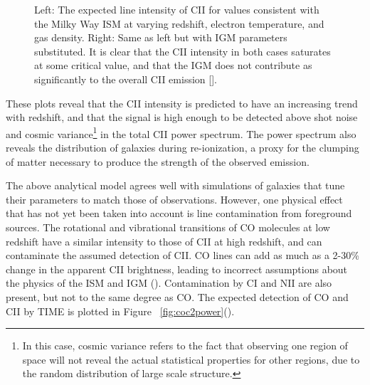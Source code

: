 \documentclass[manuscript]{aastex}
\begin{document}
\begin{figure}[H]%
    \centering
    \qquad
    \singlespace
    \caption[Calculated line intensities for CII in the ISM and IGM. -(\cite{Gong2012})]{Left: The expected line intensity of CII for values consistent with the Milky Way ISM at varying redshift, electron temperature, and gas density. Right: Same as left but with IGM parameters substituted. It is clear that the CII intensity in both cases saturates at some critical value, and that the IGM does not contribute as significantly to the overall CII emission [\cite{Gong2012}].}%
    \label{fig:gong1}%
    \vspace{-0.8cm}
\end{figure}

These plots reveal that the CII intensity is predicted to have an increasing trend with redshift, and that the signal is high enough to be detected above shot noise and cosmic variance\footnote{In this case, cosmic variance refers to the fact that observing one region of space will not reveal the actual statistical properties for other regions, due to the random distribution of large scale structure.} in the total CII power spectrum. The power spectrum also reveals the distribution of galaxies during re-ionization, a proxy for the clumping of matter necessary to produce the strength of the observed emission. 

The above analytical model agrees well with simulations of galaxies that tune their parameters to match those of observations. However, one physical effect that has not yet been taken into account is line contamination from foreground sources. The rotational and vibrational transitions of CO molecules at low redshift have a similar intensity to those of CII at high redshift, and can contaminate the assumed detection of CII. CO lines  can add as much as a 2-30\% change in the apparent CII brightness, leading to incorrect assumptions about the physics of the ISM and IGM (\cite{Gong2012}). Contamination by CI and NII are also present, but not to the same degree as CO. The expected detection of CO and CII by TIME is plotted in Figure ~\ref{fig:coc2power}(\cite{Crites2014}).
\end{document}

